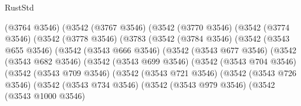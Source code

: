 \begin{lexlean}{RustStd}
\begin{coremodule}
                                            (@3764 @3546)
                                            (@3542
                                              (@3767 @3546)
                                              (@3542
                                                (@3770 @3546)
                                                (@3542
                                                  (@3774 @3546)
                                                  (@3542
                                                    (@3778 @3546)
                                                    (@3783
                                                      (@3542
                                                        (@3784 @3546)
                                                        (@3542
                                                          (@3543 @655 @3546)
                                                          (@3542
                                                            (@3543 @666 @3546)
                                                            (@3542
                                                              (@3543 @677 @3546)
                                                              (@3542
                                                                (@3543 @682 @3546)
                                                                (@3542
                                                                  (@3543 @699 @3546)
                                                                  (@3542
                                                                    (@3543 @704 @3546)
                                                                    (@3542
                                                                      (@3543 @709 @3546)
                                                                      (@3542
                                                                        (@3543 @721 @3546)
                                                                        (@3542
                                                                          (@3543 @726 @3546)
                                                                          (@3542
                                                                            (@3543 @734 @3546)
                                                                            (@3542
                                                                              (@3543 @979 @3546)
                                                                              (@3542
                                                                                (@3543 @1000 @3546)

\end{coremodule}
\end{lexlean}

